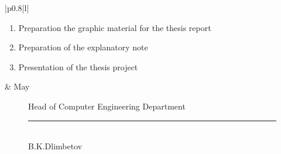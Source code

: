 \begin{titlepage}
\begin{centering}
\begin{longtable}{|p{0.8\textwidth}|l|}
\begin{enumerate}
					\item Preparation the graphic material for the thesis report
					\item Preparation of the explanatory note
					\item Presentation of the thesis project
				\end{enumerate}
				& May \\
				\hline
			\end{longtable}
		\end{centering}

		\begin{figure}[ht]
			\begin{minipage}[t]{0.5\linewidth}
				Head of Computer Engineering Department\\

				\rule{13em}{0.4pt}\\
				B.K.Dlimbetov\\
			\end{minipage}
		\end{figure}
	\end{titlepage}